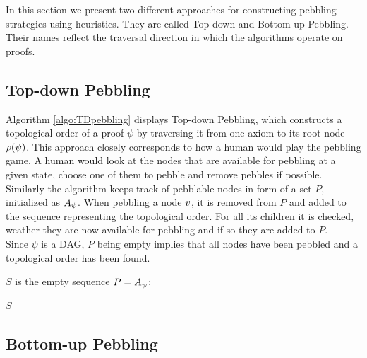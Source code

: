 \documentclass{llncs}
\begin{document}
In this section we present two different approaches for constructing pebbling strategies using heuristics.
They are called Top-down and Bottom-up Pebbling. Their names reflect the traversal direction in which the algorithms operate on proofs.

\subsection{Top-down Pebbling}

Algorithm \ref{algo:TDpebbling} displays Top-down Pebbling, which constructs a topological order of a proof $\psi$ by traversing it from one axiom to its root node $\rho(\psi)$.
This approach closely corresponds to how a human would play the pebbling game. 
A human would look at the nodes that are available for pebbling at a given state, choose one of them to pebble and remove pebbles if possible.\\
Similarly the algorithm keeps track of pebblable nodes in form of a set $P$, initialized as $A_{\psi}$.
When pebbling a node $v$, it is removed from $P$ and added to the sequence representing the topological order. 
For all its children it is checked, weather they are now available for pebbling and if so they are added to $P$.\\
Since $\psi$ is a DAG, $P$ being empty implies that all nodes have been pebbled and a topological order has been found.


\begin{algorithm}[h]
	
	$S$ is the empty sequence\;
	$P = A_{\psi}$;
	
	
	\Return $S$\;
	
  \caption[.]{}
  \label{algo:TDpebbling}
\end{algorithm}

\subsection{Bottom-up Pebbling}
\end{document}
